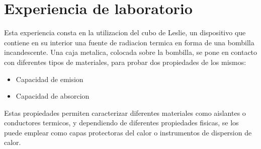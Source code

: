 \documentclass[12pt]{report}
\begin{document}
\chapter{Experiencia de laboratorio}
  Esta experiencia consta en la utilizacion del cubo de Leslie, un dispositivo que contiene en su interior una fuente
  de radiacion termica en forma de una bombilla incandescente. Una caja metalica, colocada sobre la bombilla, se pone
  en contacto con diferentes tipos de materiales, para probar dos propiedades de los mismos:
  \begin{itemize}
    \item Capacidad de emision
    \item Capacidad de absorcion
  \end{itemize}

  Estas propiedades permiten caracterizar diferentes materiales como aislantes o conductores termicos, y dependiendo de
  diferentes propiedades fisicas, se los puede emplear como capas protectoras del calor o instrumentos de dispersion de
  calor.

\end{document}
